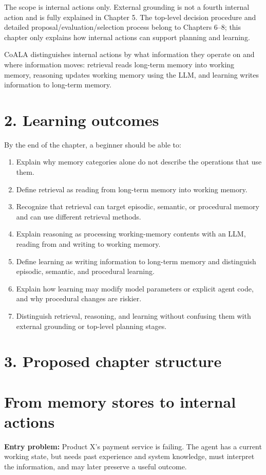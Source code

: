 The scope is internal actions only. External grounding is not a fourth internal action and is fully explained in Chapter 5. The top-level decision procedure and detailed proposal/evaluation/selection process belong to Chapters 6--8; this chapter only explains how internal actions can support planning and learning.

\begin{takeawaybox}
CoALA distinguishes internal actions by what information they operate on and where information moves: retrieval reads long-term memory into working memory, reasoning updates working memory using the LLM, and learning writes information to long-term memory.
\end{takeawaybox}

\section*{2. Learning outcomes}
By the end of the chapter, a beginner should be able to:
\begin{enumerate}
  \item Explain why memory categories alone do not describe the operations that use them.
  \item Define retrieval as reading from long-term memory into working memory.
  \item Recognize that retrieval can target episodic, semantic, or procedural memory and can use different retrieval methods.
  \item Explain reasoning as processing working-memory contents with an LLM, reading from and writing to working memory.
  \item Define learning as writing information to long-term memory and distinguish episodic, semantic, and procedural learning.
  \item Explain how learning may modify model parameters or explicit agent code, and why procedural changes are riskier.
  \item Distinguish retrieval, reasoning, and learning without confusing them with external grounding or top-level planning stages.
\end{enumerate}

\section*{3. Proposed chapter structure}
\setcounter{chapter}{4}
\section{From memory stores to internal actions}
\textbf{Entry problem:} Product X's payment service is failing. The agent has a current working state, but needs past experience and system knowledge, must interpret the information, and may later preserve a useful outcome.

